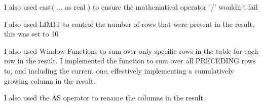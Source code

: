 \documentclass{report}
\begin{document}
	I also used cast( ... as real ) to ensure the mathematical operator '/' wouldn't fail\newline
	
	I also used LIMIT to control the number of rows that were present in the result, this was set to 10\newline
	
	I also used Window Functions to sum over only specific rows in the table for each row in the result. I implemented the function to sum over all PRECEDING rows to, and including the current one, effectively implementing a cumulatively growing column in the result. \newline
	
	I also used the AS operator to rename the columns in the result.
	
	
	
\end{document}
